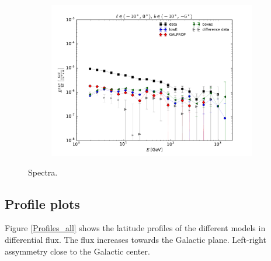 \begin{figure}
{\begin{subfigure}[b]{.4\textwidth}
		\end{subfigure}%
		\begin{subfigure}[b]{.4\textwidth}
		\centering \includegraphics[width=.95\textwidth]{plots/SED_all_left-right__l=-5_b=-8.pdf}
	\end{subfigure}%
}
\caption{Spectra.}
\label{Spectra_all}
\end{figure}



\subsection{Profile plots}

Figure \ref{Profiles_all} shows the latitude profiles of the different models in differential flux. The flux increases towards the Galactic plane. Left-right assymmetry close to the Galactic center. 


